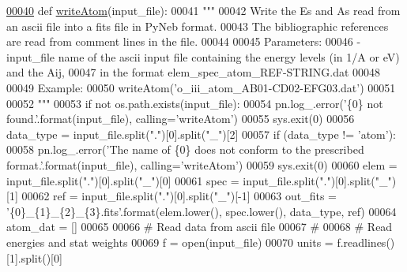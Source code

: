 \begin{DoxyCode}
\hypertarget{namespacepyneb_1_1utils_1_1fits_l00040}{}\hyperlink{namespacepyneb_1_1utils_1_1fits_a6f08de2b93e2ebc207309560746e9235}{00040} \textcolor{keyword}{def }\hyperlink{namespacepyneb_1_1utils_1_1fits_a6f08de2b93e2ebc207309560746e9235}{writeAtom}(input\_file):
00041     \textcolor{stringliteral}{""" }
00042 \textcolor{stringliteral}{    Write the Es and As read from an ascii file into a fits file in PyNeb format.}
00043 \textcolor{stringliteral}{    The bibliographic references are read from comment lines in the file.}
00044 \textcolor{stringliteral}{        }
00045 \textcolor{stringliteral}{    Parameters:}
00046 \textcolor{stringliteral}{        - input\_file    name of the ascii input file containing the energy levels (in 1/A or eV) and the
       Aij,}
00047 \textcolor{stringliteral}{                        in the format elem\_spec\_atom\_REF-STRING.dat}
00048 \textcolor{stringliteral}{}
00049 \textcolor{stringliteral}{    Example: }
00050 \textcolor{stringliteral}{    writeAtom('o\_iii\_atom\_AB01-CD02-EFG03.dat')}
00051 \textcolor{stringliteral}{}
00052 \textcolor{stringliteral}{    """}
00053     \textcolor{keywordflow}{if} \textcolor{keywordflow}{not} os.path.exists(input\_file):
00054         pn.log\_.error(\textcolor{stringliteral}{'\{0\} not found.'}.format(input\_file), calling=\textcolor{stringliteral}{'writeAtom'})
00055         sys.exit(0)
00056     data\_type = input\_file.split(\textcolor{stringliteral}{"."})[0].split(\textcolor{stringliteral}{"\_"})[2]
00057     \textcolor{keywordflow}{if} (data\_type != \textcolor{stringliteral}{'atom'}):
00058         pn.log\_.error(\textcolor{stringliteral}{'The name of \{0\} does not conform to the prescribed format.'}.format(input\_file), 
      calling=\textcolor{stringliteral}{'writeAtom'})
00059         sys.exit(0)
00060     elem = input\_file.split(\textcolor{stringliteral}{"."})[0].split(\textcolor{stringliteral}{"\_"})[0]
00061     spec = input\_file.split(\textcolor{stringliteral}{"."})[0].split(\textcolor{stringliteral}{"\_"})[1]
00062     ref = input\_file.split(\textcolor{stringliteral}{"."})[0].split(\textcolor{stringliteral}{"\_"})[-1]
00063     out\_fits = \textcolor{stringliteral}{'\{0\}\_\{1\}\_\{2\}\_\{3\}.fits'}.format(elem.lower(), spec.lower(), data\_type, ref)
00064     atom\_dat = []
00065 
00066     \textcolor{comment}{# Read data from ascii file}
00067     \textcolor{comment}{#}
00068     \textcolor{comment}{# Read energies and stat weights }
00069     f = open(input\_file)
00070     units = f.readlines()[1].split()[0]

\end{DoxyCode}
